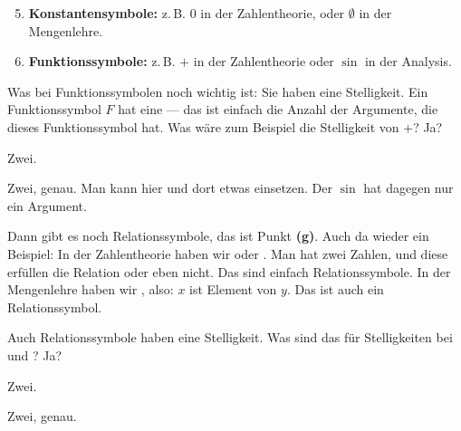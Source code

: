\begin{math-stroke}
\begin{enumerate}[label=\textbf{(\alph*)}]
    \setcounter{enumi}{4}
    \item \textbf{Konstantensymbole:} z.\,B. $0$ in der Zahlentheorie, oder $\emptyset$ in der Mengenlehre.
    \item \textbf{Funktionssymbole:} z.\,B. $+$ in der Zahlentheorie oder $\sin$ in der Analysis.
\end{enumerate}
\end{math-stroke}

\begin{spoken-clean}[00:37:35 - 00:40:30]
Was bei Funktionssymbolen noch wichtig ist: Sie haben eine Stelligkeit. Ein Funktionssymbol $F$ hat eine  --- das ist einfach die Anzahl der Argumente, die dieses Funktionssymbol hat. Was wäre zum Beispiel die Stelligkeit von $+$? Ja?
\end{spoken-clean}

\begin{student-interaction}
Zwei.
\end{student-interaction}

\begin{spoken-clean}[continued]
Zwei, genau. Man kann hier und dort etwas einsetzen. Der $\sin$ hat dagegen nur ein Argument. 

Dann gibt es noch Relationssymbole, das ist Punkt \textbf{(g)}. Auch da wieder ein Beispiel: In der Zahlentheorie haben wir  oder . Man hat zwei Zahlen, und diese erfüllen die Relation oder eben nicht. Das sind einfach Relationssymbole. In der Mengenlehre haben wir , also: $x$ ist Element von $y$. Das ist auch ein Relationssymbol. 

Auch Relationssymbole haben eine Stelligkeit. Was sind das für Stelligkeiten bei  und ? Ja?
\end{spoken-clean}

\begin{student-interaction}
Zwei.
\end{student-interaction}

\begin{spoken-clean}[continued]
Zwei, genau.
\end{spoken-clean}

